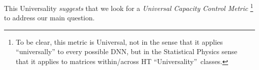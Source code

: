 This Universality \emph{suggests} that we look for a \emph{Universal Capacity Control Metric}%
\footnote{To be clear, this metric is Universal, not in the sense that it applies ``universally'' to every possible DNN, but in the Statistical Physics sense~\cite{SornetteBook,BouchaudPotters03} that it applies to matrices within/across HT ``Universality''~classes.}
to address our main question.

